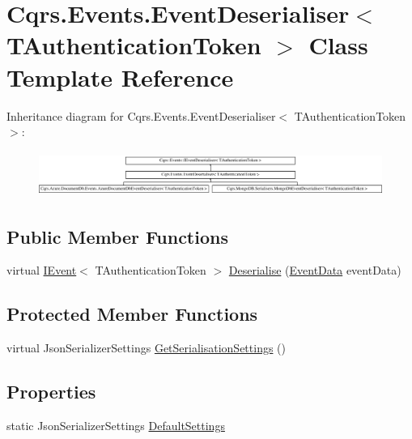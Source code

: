\hypertarget{classCqrs_1_1Events_1_1EventDeserialiser}{}\section{Cqrs.\+Events.\+Event\+Deserialiser$<$ T\+Authentication\+Token $>$ Class Template Reference}
\label{classCqrs_1_1Events_1_1EventDeserialiser}
Inheritance diagram for Cqrs.\+Events.\+Event\+Deserialiser$<$ T\+Authentication\+Token $>$\+:\begin{figure}[H]
\begin{center}
\leavevmode
\includegraphics[height=1.508079cm]{classCqrs_1_1Events_1_1EventDeserialiser}
\end{center}
\end{figure}
\subsection*{Public Member Functions}
\begin{DoxyCompactItemize}
\item 
virtual \hyperlink{interfaceCqrs_1_1Events_1_1IEvent}{I\+Event}$<$ T\+Authentication\+Token $>$ \hyperlink{classCqrs_1_1Events_1_1EventDeserialiser_a193feac1d58446f0a7447d8ba04179fc_a193feac1d58446f0a7447d8ba04179fc}{Deserialise} (\hyperlink{classCqrs_1_1Events_1_1EventData}{Event\+Data} event\+Data)
\end{DoxyCompactItemize}
\subsection*{Protected Member Functions}
\begin{DoxyCompactItemize}
\item 
virtual Json\+Serializer\+Settings \hyperlink{classCqrs_1_1Events_1_1EventDeserialiser_a3f767a1b793ea47bcafd9c64be47619e_a3f767a1b793ea47bcafd9c64be47619e}{Get\+Serialisation\+Settings} ()
\end{DoxyCompactItemize}
\subsection*{Properties}
\begin{DoxyCompactItemize}
\item 
static Json\+Serializer\+Settings \hyperlink{classCqrs_1_1Events_1_1EventDeserialiser_a08bd067ca7ce8c28c7a83d444b7e468b_a08bd067ca7ce8c28c7a83d444b7e468b}{Default\+Settings}
\end{DoxyCompactItemize}


